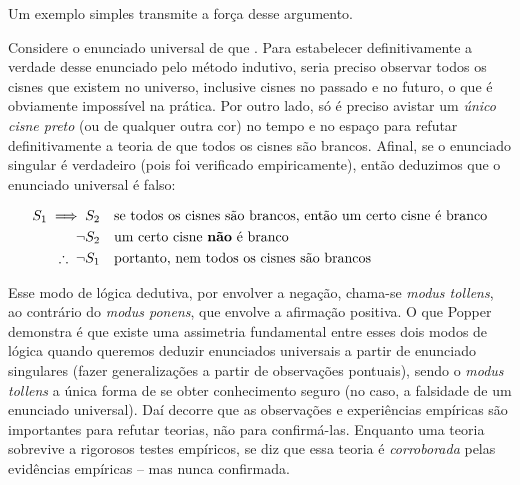 \documentclass[./main.tex]{subfiles}
\begin{document}
\par Um exemplo simples transmite a força desse argumento. 

\par Considere o enunciado universal de que . Para estabelecer definitivamente a verdade desse enunciado pelo método indutivo, seria preciso observar todos os cisnes que existem no universo, inclusive cisnes no passado e no futuro, o que é obviamente impossível na prática. Por outro lado, só é preciso avistar um \textit{único cisne preto} (ou de qualquer outra cor) no tempo e no espaço para refutar definitivamente a teoria de que todos os cisnes são brancos. Afinal, se o enunciado singular  é verdadeiro (pois foi verificado empiricamente), então deduzimos que o enunciado universal  é falso:
\begin{linenomath*}
    \begin{align*}
        S_1 \implies S_2 & \quad \textnormal{se todos os cisnes são brancos, então um certo cisne é branco} \\
        \neg S_2 & \quad \textnormal{um certo cisne \textbf{não} é branco}\\
        \therefore\;\neg S_1 & \quad \textnormal{portanto, nem todos os cisnes são brancos}
    \end{align*}
\end{linenomath*}
Esse modo de lógica dedutiva, por envolver a negação, chama-se \textit{modus tollens}, ao contrário do \textit{modus ponens}, que envolve a afirmação positiva. O que Popper demonstra é que existe uma assimetria fundamental entre esses dois modos de lógica quando queremos deduzir enunciados universais a partir de enunciado singulares (fazer generalizações a partir de observações pontuais), sendo o \textit{modus tollens} a única forma de se obter conhecimento seguro (no caso, a falsidade de um enunciado universal). Daí decorre que as observações e experiências empíricas são importantes para refutar teorias, não para confirmá-las. Enquanto uma teoria sobrevive a rigorosos testes empíricos, se diz que essa teoria é \textit{corroborada} pelas evidências empíricas – mas nunca confirmada.
\end{document}
